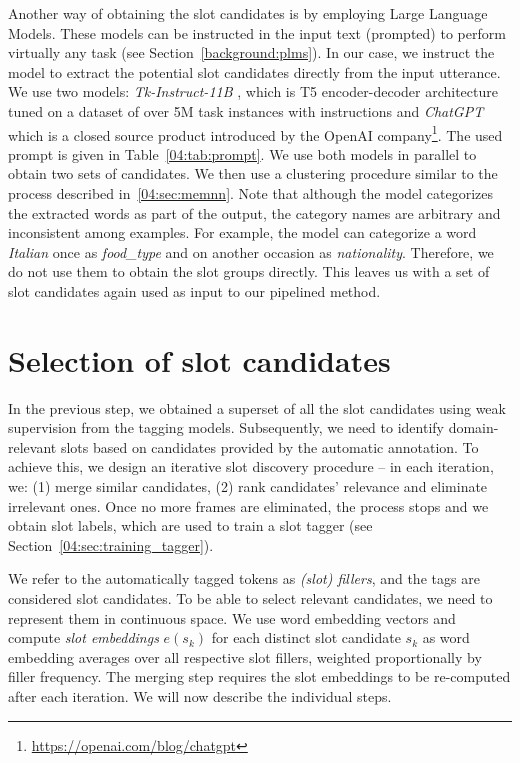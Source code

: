 Another way of obtaining the slot candidates is by employing Large Language Models.
These models can be instructed in the input text (prompted) to perform virtually any task (see Section~\ref{background:plms}).
In our case, we instruct the model to extract the potential slot candidates directly from the input utterance.
We use two models: \emph{Tk-Instruct-11B} \cite{supernaturalinstructions}, which is T5 encoder-decoder architecture \cite{2020t5} tuned on a dataset of over 5M task instances with instructions and \emph{ChatGPT} which is a closed source product introduced by the OpenAI company\footnote{\url{https://openai.com/blog/chatgpt}}.
The used prompt is given in Table~\ref{04:tab:prompt}.
We use both models in parallel to obtain two sets of candidates.
We then use a clustering procedure similar to the process described in~\ref{04:sec:memnn}.
Note that although the model categorizes the extracted words as part of the output, the category names are arbitrary and inconsistent among examples.
For example, the model can categorize a word \emph{Italian} once as \textit{food\_type} and on another occasion as \emph{nationality}.
Therefore, we do not use them to obtain the slot groups directly.
This leaves us with a set of slot candidates again used as input to our pipelined method.

\section{Selection of slot candidates}
\label{04:sec:candidate_selection}

In the previous step, we obtained a superset of all the slot candidates using weak supervision from the tagging models.
Subsequently, we need to identify domain-relevant slots based on candidates provided by the automatic annotation.
To achieve this, we design an iterative slot discovery procedure -- in each iteration, we: 
(1) merge similar candidates, 
(2) rank candidates' relevance and eliminate irrelevant ones.
Once no more frames are eliminated, the process stops and we obtain slot labels, which are used to train a slot tagger (see Section~\ref{04:sec:training_tagger}).

We refer to the automatically tagged tokens as \emph{(slot) fillers}, and the tags are considered slot candidates.
To be able to select relevant candidates, we need to represent them in continuous space.
We use word embedding vectors and compute \emph{slot embeddings} $e(s_k)$ for each 
distinct slot candidate $s_k$ as word embedding averages over all respective slot fillers, weighted proportionally by filler frequency.
The merging step requires the slot embeddings to be re-computed after each iteration.
We will now describe the individual steps.

